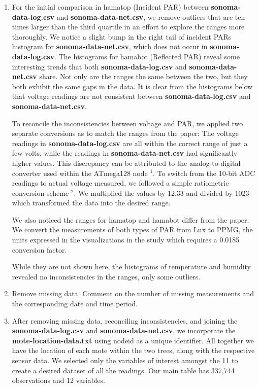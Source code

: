 \documentclass[11pt]{article}
\begin{document}
\begin{enumerate}[label=(\alph*)]
\item
For the initial comparison in hamatop (Incident PAR) between \textbf{sonoma-data-log.csv} and \textbf{sonoma-data-net.csv}, we remove outliers that are ten times larger than the third quartile in an effort to explore the ranges more thoroughly. We notice a slight bump in the right tail of incident PARs histogram for \textbf{sonoma-data-net.csv}, which does not occur in \textbf{sonoma-data-log.csv}.
The histograms for hamabot (Reflected PAR) reveal some interesting trends that both \textbf{sonoma-data-log.csv} and \textbf{sonoma-data-net.csv} share. Not only are the ranges the same between the two, but they both exhibit the same gaps in the data.
It is clear from the histograms below that voltage readings are not consistent between \textbf{sonoma-data-log.csv} and \textbf{sonoma-data-net.csv}.

To reconcile the inconsistencies between voltage and PAR, we applied two separate conversions as to match the ranges from the paper: \newline
The voltage readings in \textbf{sonoma-data-log.csv} are all within the correct range of just a few volts, while the readings in \textbf{sonoma-data-net.csv} had significantly higher values. This discrepancy can be attributed to the analog-to-digital converter used within the ATmega128 node $^1$. To switch from the 10-bit ADC readings to actual voltage measured, we followed a simple ratiometric conversion scheme $^2$. We multiplied the values by 12.33 and divided by 1023 which transformed the data into the desired range.

We also noticed the ranges for hamatop and hamabot differ from the paper. We convert the measurements of both types of PAR from Lux to PPMG, the units expressed in the visualizations in the study which requires a 0.0185 conversion factor.


While they are not shown here, the histograms of temperature and humidity revealed no inconsistencies in the ranges, only some outliers.



\item Remove missing data. Comment on the number of missing measurements and the corresponding date and time period.

\item
After removing missing data, reconciling inconsistencies, and joining the \textbf{sonoma-data-log.csv} and \textbf{sonoma-data-net.csv}, we incorporate the \textbf{mote-location-data.txt} using nodeid as a unique identifier. All together we have the location of each mote within the two trees, along with the respective sensor data. We selected only the variables of interest amongst the 11 to create a desired dataset of all the readings. Our main table has 337,744 observations and 12 variables.


\end{enumerate}
\end{document}
